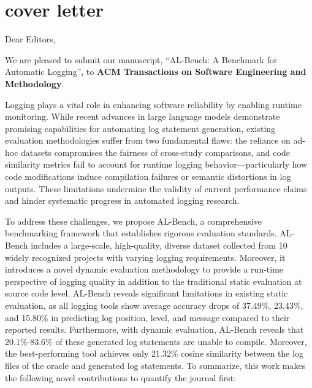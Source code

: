 \section{cover letter}

\noindent Dear Editors,

We are pleased to submit our manuscript, “AL-Bench: A Benchmark for Automatic Logging”,
to \textbf{ACM Transactions on Software Engineering and Methodology}. 

Logging plays a vital role in enhancing software reliability by enabling runtime monitoring. While recent advances in large language models demonstrate promising capabilities for automating log statement generation, existing evaluation methodologies suffer from two fundamental flaws: the reliance on ad-hoc datasets compromises the fairness of cross-study comparisons, and code similarity metrics fail to account for runtime logging behavior—particularly how code modifications induce compilation failures or semantic distortions in log outputs. These limitations undermine the validity of current performance claims and hinder systematic progress in automated logging research.

To address these challenges, we propose AL-Bench, a comprehensive benchmarking framework that establishes rigorous evaluation standards. 
AL-Bench includes a large-scale, high-quality, diverse dataset collected from 10
widely recognized projects with varying logging requirements. Moreover, it introduces a novel dynamic evaluation methodology
to provide a run-time perspective of logging quality in addition to the traditional static evaluation at source code level. 
AL-Bench reveals significant limitations in existing static evaluation, as all logging tools show average accuracy drops of 37.49\%, 23.43\%, and 15.80\% in predicting log position, level,
and message compared to their reported results. Furthermore, with dynamic evaluation, AL-Bench reveals that 20.1\%-83.6\% of these
generated log statements are unable to compile. Moreover, the best-performing tool achieves only 21.32\% cosine similarity between
the log files of the oracle and generated log statements. To summarize, this work makes the following novel contributions to quantify the journal first:

